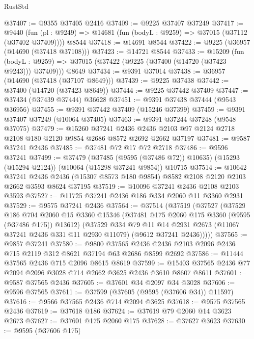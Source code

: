 \begin{lexlean}{RustStd}
\begin{coremodule}
@37407 := @9355 @37405 @2416
@37409 := @9225 @37407 @37249
@37417 := @9440
    (fun (pl : @9249) => @14681 (fun (bodyL : @9259) => @37015 (@37112 (@37402 @37409))))
    @8544
@37418 := @14691 @8544
@37422 := @9225 (@36957 (@14690 (@37418 @37108)))
@37423 := @14721 @8544
@37433 := @15209
    (fun (bodyL : @9259) => @37015 (@37422 (@9225 (@37400 (@14720 (@37423 @9243))) @37409)))
    @8649
@37434 := @9391 @37014
@37438 := @36957 (@14690 (@37418 (@37107 @8649)))
@37439 := @9225 @37438
@37442 := @37400 (@14720 (@37423 @8649))
@37444 := @9225 @37442 @37409
@37447 := @37434 (@37439 @37444) @36628
@37451 := @9391 @37438 @37444 (@9543 @36956)
@37455 := @9391 @37442 @37409 (@15246 @37399)
@37459 := @9391 @37407 @37249 (@10064 @37405)
@37463 := @9391 @37244 @37248 (@9548 @37075)
@37479 := @15260
    @37241
    @2436
    @2436
    @2103
    @97
    @2124
    @2718
    @2108
    @180
    @2120
    @9854
    @2686
    @8572
    @2692
    @2662
    @37197
@37481 := @9587 @37241 @2436
@37485 := @37481 @72 @17 @72 @2718
@37486 := @9596 @37241
@37499 := @37479
    (@37485 (@9595 (@37486 @72)) @10635)
    (@15293 (@15294 @2124))
    (@10064 (@15298 @37241 @9854))
    @10715
@37514 := @10642
    @37241
    @2436
    @2436
    (@15307 @8573 @180 @9854)
    @8582
    @2108
    @2120
    @2103
    @2662
    @3593
    @8624
    @37195
@37519 := @10096 @37241 @2436 @2108 @2103 @3593
@37527 := @11725 @37241 @2436 @186 @334 @2060 @11 @3360 @2931
@37529 := @9575 @37241 @2436
@37564 := @37514
    (@37519
      (@37527
        (@37529
          @186
          @704
          @2060
          @15
          @3360
          @15346
          (@37481 @175 @2060 @175 @3360 (@9595 (@37486 @175)) @13612)
          (@37529
            @334
            @79
            @11
            @14
            @2931
            @2673
            (@11067 @37241 @2436 @331 @11 @2930 @11079)
            (@9612 @37241 @2436)))))
@37565 := @9857 @37241
@37580 := @9800
    @37565
    @2436
    @2436
    @2103
    @2096
    @2436
    @715
    @2119
    @312
    @8621
    @37194
    @63
    @2686
    @8599
    @2692
@37586 := @11444 @37565 @2436 @715 @2096 @8615 @8619
@37599 := @15403 @37565 @2436 @77 @2094 @2096 @3028 @714 @2662 @3625 @2436 @3610 @8607 @8611
@37601 := @9587 @37565 @2436
@37605 := @37601 @34 @2097 @34 @3028
@37606 := @9596 @37565
@37611 := @37599 (@37605 (@9595 (@37606 @34)) @11597)
@37616 := @9566 @37565 @2436 @714 @2094 @3625
@37618 := @9575 @37565 @2436
@37619 := @37618 @186
@37624 := @37619 @79 @2060 @14 @3623 @2673
@37627 := @37601 @175 @2060 @175
@37628 := @37627 @3623
@37630 := @9595 (@37606 @175)

\end{coremodule}
\end{lexlean}
